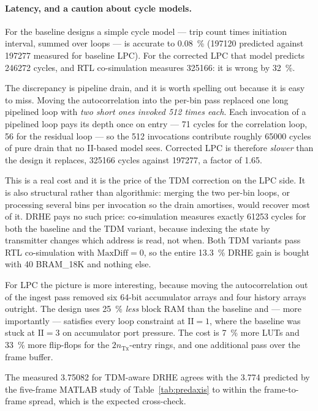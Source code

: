 \documentclass[10pt,twocolumn]{article}
\begin{document}
\paragraph{Latency, and a caution about cycle models.}
For the baseline designs a simple cycle model --- trip count times initiation
interval, summed over loops --- is accurate to \SI{0.08}{\percent}
(\num{197120} predicted against \num{197277} measured for baseline LPC). For
the corrected LPC that model predicts \num{246272} cycles, and RTL
co-simulation measures \num{325166}: it is wrong by \SI{32}{\percent}.

The discrepancy is pipeline drain, and it is worth spelling out because it is
easy to miss. Moving the autocorrelation into the per-bin pass replaced one
long pipelined loop with \emph{two short ones invoked \num{512} times each}.
Each invocation of a pipelined loop pays its depth once on entry --- 71 cycles
for the correlation loop, 56 for the residual loop --- so the \num{512}
invocations contribute roughly \num{65000} cycles of pure drain that no
II-based model sees. Corrected LPC is therefore \emph{slower} than the design
it replaces, \num{325166} cycles against \num{197277}, a factor of \num{1.65}.

This is a real cost and it is the price of the TDM correction on the LPC side.
It is also structural rather than algorithmic: merging the two per-bin loops,
or processing several bins per invocation so the drain amortises, would recover
most of it. DRHE pays no such price: co-simulation measures exactly
\num{61253} cycles for both the baseline and the TDM variant, because indexing
the state by transmitter changes which address is read, not when. Both TDM
variants pass RTL co-simulation with $\mathrm{MaxDiff} = 0$, so the entire
\SI{13.3}{\percent} DRHE gain is bought with \num{40} BRAM\_18K and nothing
else.

For LPC the picture is more interesting, because moving the autocorrelation out
of the ingest pass removed six 64-bit accumulator arrays and four history
arrays outright. The design uses \SI{25}{\percent} \emph{less} block RAM than
the baseline and --- more importantly --- satisfies every loop constraint at
$\mathrm{II}=1$, where the baseline was stuck at $\mathrm{II}=3$ on accumulator
port pressure. The cost is \SI{7}{\percent} more LUTs and \SI{33}{\percent}
more flip-flops for the $2n_{\mathrm{Tx}}$-entry rings, and one additional pass
over the frame buffer.

The measured \num{3.75082} for TDM-aware DRHE agrees with the \num{3.774}
predicted by the five-frame MATLAB study of Table~\ref{tab:predaxis} to within
the frame-to-frame spread, which is the expected cross-check.
\end{document}
